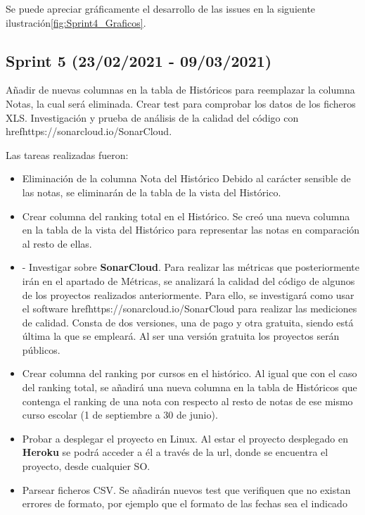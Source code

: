 Se puede apreciar gráficamente el desarrollo de las issues en la siguiente ilustración\ref{fig:Sprint4_Graficos}.


\subsection{Sprint 5 (23/02/2021 - 09/03/2021)}
Añadir de nuevas columnas en la tabla de Históricos para reemplazar la columna Notas, la cual será eliminada. Crear test para comprobar los datos de los ficheros XLS. Investigación y prueba de análisis de la calidad del código con href{https://sonarcloud.io/}{SonarCloud}.

Las tareas realizadas fueron:
\begin{itemize}
	\tightlist
	\item Eliminación de la columna Nota del Histórico
		Debido al carácter sensible de las notas, se eliminarán de la tabla de la vista del Histórico.
	\item Crear columna del ranking total en el Histórico. 
		Se creó una nueva columna en la tabla de la vista del Histórico para representar las notas en comparación al resto de ellas.
	\item -	Investigar sobre \textbf{SonarCloud}. 
		Para realizar las métricas que posteriormente irán en el apartado de Métricas, se analizará la calidad del código de algunos de los proyectos realizados anteriormente. Para ello, se investigará como usar el software href{https://sonarcloud.io/}{SonarCloud} para realizar las mediciones de calidad. Consta de dos versiones, una de pago y otra gratuita, siendo está última la que se empleará. Al ser una versión gratuita los proyectos serán públicos. 
	\item Crear columna del ranking por cursos en el histórico. 
		Al igual que con el caso del ranking total, se añadirá una nueva columna en la tabla de Históricos que contenga el ranking de una nota con respecto al resto de notas de ese mismo curso escolar (1 de septiembre a 30 de junio). 
	\item Probar a desplegar el proyecto en Linux.
	 	Al estar el proyecto desplegado en \textbf{Heroku} se podrá acceder a él a través de la url, donde se encuentra el proyecto, desde cualquier SO.
	\item Parsear ficheros CSV. 
		Se añadirán nuevos test que verifiquen que no existan errores de formato, por ejemplo que el formato de las fechas sea el indicado

\end{itemize}
